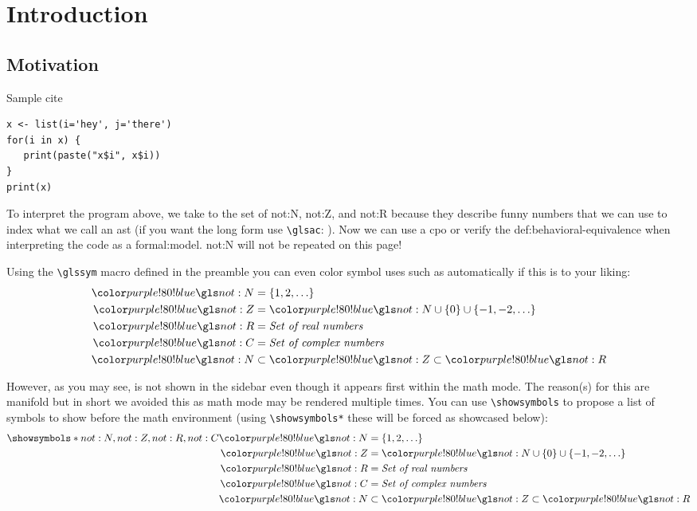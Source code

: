 \setchaptertoc
\chapter{Introduction}\label{chp:introduction}

\section{Motivation}

Sample cite~\cite{DBLP:conf/msr/SihlerPSTDD24}

\begin{verbatim}
x <- list(i='hey', j='there')
for(i in x) {
   print(paste("x$i", x$i))
}
print(x)
\end{verbatim}


To interpret the program above, we take  to the set of \gls{not:N}, \gls{not:Z}, and \gls{not:R} because they describe funny numbers that we can use to index what we call an \gls{ast} (if you want the long form use \texttt{\textbackslash glsac}: ). Now we can use a \gls{cpo} or verify the \gls{def:behavioral-equivalence} when interpreting the code as a \gls{formal:model}.
\gls{not:N} will not be repeated on this page!

Using the \texttt{\textbackslash glssym} macro defined in the preamble you can even color symbol uses such as  automatically if this is to your liking:
\begin{align}
   \glssym{not:N} &= \{1, 2, \ldots\} \\
   \glssym{not:Z} &= \glssym{not:N} \cup \{0\} \cup \{-1, -2, \ldots\} \\
   \glssym{not:R} &= \textit{Set of real numbers} \\
   \glssym{not:C} &= \textit{Set of complex numbers} \\
   \glssym{not:N} &\subset \glssym{not:Z} \subset \glssym{not:R} %
\end{align}

However, as you may see,  is not shown in the sidebar even though it appears first within the math mode. The reason(s) for this are manifold but in short we avoided this as math mode may be rendered multiple times. 
You can use \texttt{\textbackslash showsymbols} to propose a list of symbols to show before the math environment (using \texttt{\textbackslash showsymbols*} these will be forced as showcased below):
\begin{align}
   \showsymbols*{not:N,not:Z,not:R,not:C}
   \glssym{not:N} &= \{1, 2, \ldots\} \\
   \glssym{not:Z} &= \glssym{not:N} \cup \{0\} \cup \{-1, -2, \ldots\} \\
   \glssym{not:R} &= \textit{Set of real numbers} \\
   \glssym{not:C} &= \textit{Set of complex numbers} \\
   \glssym{not:N} &\subset \glssym{not:Z} \subset \glssym{not:R} %
\end{align}

